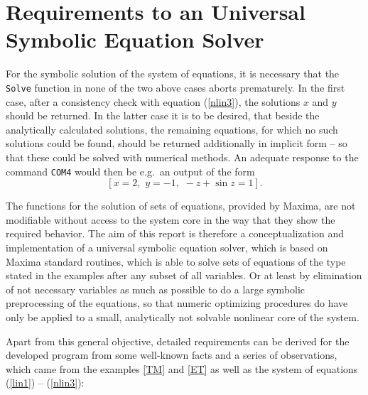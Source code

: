 
\section[Requirements to an Symbolic Equation Solver]%
{\label{SolverAnforderungen}Requirements to an Universal Symbolic Equation Solver}

For the symbolic solution of the system of  equations, it is necessary that the  \verb+Solve+ function in none of the two above cases aborts prematurely. In the first case, after a consistency check with equation (\ref{nlin3}), the solutions $x$ and $y$ should be returned. 
In the latter case it is to be desired, that beside the analytically calculated solutions, the remaining equations, for which no such solutions could be found, should be  returned additionally in implicit form -- so that these could be solved with numerical methods. An adequate response to the command \verb+COM4+ would then be e.g.\ an output of the form
\begin{displaymath}
\left[ x = 2, \,\, y = -1, \,\, -z + \sin z = 1 \right].
\end{displaymath}  

The functions for the solution of sets of equations, provided by Maxima, are not modifiable without access to the system core in the way that they show the required behavior. The aim of this report is therefore a conceptualization and implementation of a universal symbolic equation solver, which is based on  Maxima standard routines, which is able to solve sets of equations of the type stated in the examples after any subset of all variables. Or at least by elimination of not necessary variables as much as possible  to do a large symbolic preprocessing of the equations, so that numeric optimizing procedures do have  only be applied to a small, analytically not solvable nonlinear core of the system. 

Apart from this general objective, detailed requirements can be derived for the developed program  from some well-known facts and a series of observations, which came from the examples \ref{TM} and \ref{ET}  as well as the system of equations (\ref{lin1}) -- (\ref{nlin3}):

